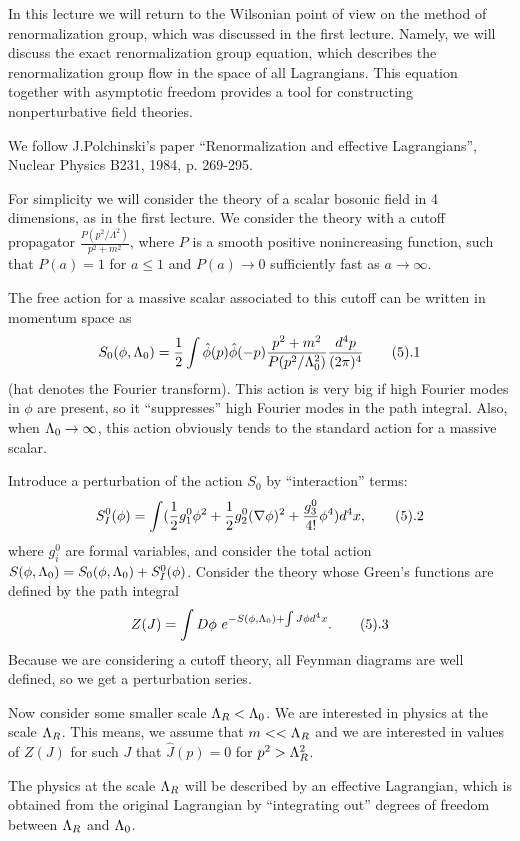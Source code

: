In this lecture we will return to the Wilsonian point of view 
on the method of renormalization group, which was discussed in the first 
lecture. Namely, we will discuss the exact renormalization group equation, 
which describes the renormalization group flow in the space of all 
Lagrangians. This equation together with asymptotic freedom 
provides a tool for constructing nonperturbative field theories. 

We follow J.Polchinski's paper ``Renormalization and effective 
Lagrangians'', Nuclear Physics B231, 1984, p. 269-295. 

For simplicity we will consider the theory of a scalar bosonic field
in 4 dimensions, as 
in the first lecture. We consider the theory with a cutoff propagator 
$\frac{P(p^2/\Lambda^2)}{p^2+m^2}$, where $P$ is a smooth 
positive nonincreasing function, such that $P(a)=1$ for 
$a\le 1$ and $P(a)\to 0$ sufficiently fast as $a\to \infty$. 

The free action for a massive scalar associated to this cutoff
can be written in momentum space as
$$
S_0(\phi,\L_0)=\frac{1}{2}
\int\hat\phi(p)\hat\phi(-p)\frac{p^2+m^2}{P(p^2/\Lambda_0^2)}\frac{d^4p}{(2\pi)^4}
\tag 5.1
$$
(hat denotes the Fourier transform).
This action is very big if high Fourier modes in $\phi$ are present, so 
it ``suppresses'' high Fourier modes in the path integral. 
Also, when $\Lambda_0\to\infty$, 
this action obviously tends to the standard action for a massive scalar.

Introduce a perturbation of the action $S_0$ by ``interaction'' terms: 
$$
S_I^0(\phi)=\int(\frac{1}{2}g_1^0\phi^2+\frac{1}{2}g_2^0(\nabla\phi)^2
+\frac{g_3^0}{4!}\phi^4)d^4x,\tag 5.2
$$
where $g_i^0$ are formal variables, and consider 
the total action $S(\phi,\Lambda_0)=S_0(\phi,\Lambda_0)+S_I^0(\phi)$. 
Consider the theory whose Green's functions are defined by the 
path integral 
$$
Z(J)=\int D\phi\ e^{-S(\phi,\L_0)+\int J\phi d^4x}.\tag 5.3
$$
Because we are considering a cutoff theory, all Feynman diagrams are well 
defined, so we get a perturbation series. 

Now consider some smaller scale $\Lambda_R<\Lambda_0$. 
We are interested in physics at the scale $\Lambda_R$. 
This means, we assume that $m<<\Lambda_R$ and we are interested in values of 
$Z(J)$ for such $J$ that $\hat J(p)=0$ for $p^2>\Lambda_R^2$. 

The physics at the scale $\Lambda_R$ will be described by an effective 
Lagrangian, which is obtained from the original Lagrangian by 
``integrating out'' degrees of freedom between $\Lambda_R$ and $\Lambda_0$. 

